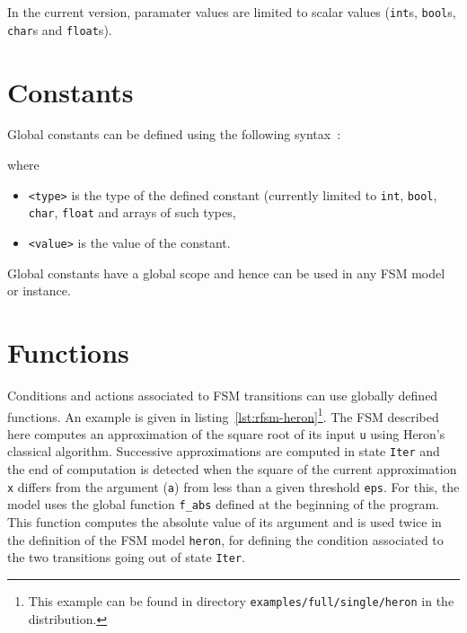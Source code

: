 \medskip
In the current version, paramater values are limited to scalar values (\texttt{int}s,
\texttt{bool}s, \texttt{char}s and \texttt{float}s). 




\section{Constants}
\label{sec:constants}

Global constants can be defined using the following syntax~:  

\begin{center}
\end{center}

\noindent
where
\begin{itemize}
\item \lstinline[language=Rfsm]|<type>| is the type of the defined constant (currently limited to
  \verb|int|, \verb|bool|, \verb|char|, \verb|float| and arrays of such types,
\item \lstinline[language=Rfsm]|<value>| is the value of the constant.
\end{itemize}

Global constants have a global scope and hence can be used in any FSM model or instance.

\section{Functions}
\label{sec:functions}

Conditions and actions associated to FSM transitions can use globally defined functions. An example
is given in listing~\ref{lst:rfsm-heron}\footnote{This example can be found in directory
  \texttt{examples/full/single/heron} in the distribution.}. The FSM described here computes an approximation
of the square root of its input \verb|u| using Heron's classical algorithm. Successive approximations are computed in
state \verb|Iter| and the end of computation is detected when the square of the current
approximation \verb|x| differs from the argument (\verb|a|) from less than a given threshold
\verb|eps|. For this, the model uses the global function \verb|f_abs| defined at the beginning of
the program. This function computes the absolute value of its argument and is used twice in the
definition of the FSM model \verb|heron|, for defining the condition associated to the two
transitions going out of state \verb|Iter|.

